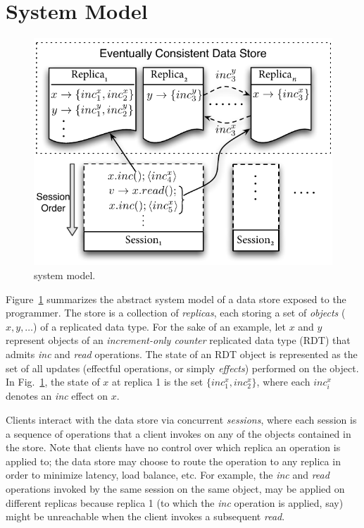 \section{System Model}
\label{sec:sysmod}

\begin{figure}
\centering
\includegraphics[scale=0.9]{Figures/SystemModel}
\caption{\name system model.}
\label{fig:sysmod}
\end{figure}

Figure~\ref{fig:sysmod} summarizes the abstract system model of a data
store exposed to the \name programmer. The store is a collection of
\emph{replicas}, each storing a set of \emph{objects} ($x,y,\ldots$)
of a replicated data type. For the sake of an example,  let $x$ and
$y$ represent objects of an \emph{increment-only counter} replicated
data type (RDT) that admits \emph{inc} and \emph{read} operations. The
state of an RDT object is represented as the set of all updates
(effectful operations, or simply \emph{effects}) performed on the
object. In Fig.~\ref{fig:sysmod}, the state of $x$ at replica 1 is the
set $\{inc^x_1,inc^x_2\}$, where each $inc^x_i$ denotes an \emph{inc}
effect on $x$.

Clients interact with the data store via concurrent \emph{sessions},
where each session is a sequence of operations that a client invokes
on any of the objects contained in the store. Note that clients have
no control over which replica an operation is applied to; the data
store may choose to route the operation to any replica in order to
minimize latency, load balance, etc. For example, the \emph{inc} and
\emph{read} operations invoked by the same session on the same object,
may be applied on different replicas because replica 1 (to which the
\emph{inc} operation is applied, say) might be unreachable when the
client invokes a subsequent \emph{read}.

